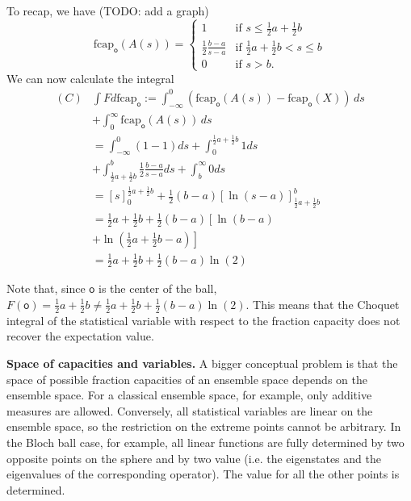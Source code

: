\documentclass[10pt,twocolumn, nofootinbib]{revtex4-2}
\newcommand\frcap{\mathrm{fcap}}
\newcommand{\ens}[1][e] {\mathsf{#1}} %
\begin{document}
To recap, we have (TODO: add a graph)
\begin{equation}
	\frcap_{\ens[o]}(A(s))=
	\begin{cases}
		1 & \text{if } s\leq \frac{1}{2} a + \frac{1}{2} b\\
		\frac{1}{2} \frac{b - a}{s-a} & \text{if } \frac{1}{2} a + \frac{1}{2} b < s \leq b\\
		0 & \text{if } s > b.
	\end{cases}
\end{equation}
We can now calculate the integral
\begin{equation}
	\begin{aligned}
		(C)&\int F d\frcap_{\ens[o]} := 
		\int_{-\infty}^0
		(\frcap_{\ens[o]} (A(s))-\frcap_{\ens[o]}(X))\, ds \\
		&+
		\int^\infty_0
		\frcap_{\ens[o]} (A(s))\, ds \\
		&= \int_{-\infty}^0 (1 - 1)ds + \int_{0}^{\frac{1}{2} a + \frac{1}{2} b}  1 ds \\
		&+ \int_{\frac{1}{2} a + \frac{1}{2} b}^{b}  \frac{1}{2} \frac{b - a}{s-a} ds + \int_{b}^{\infty} 0 ds \\
		&=\left[s\right]_{0}^{\frac{1}{2} a + \frac{1}{2} b}
		+ \frac{1}{2}\left(b - a\right)\left[\ln (s - a)\right]_{\frac{1}{2} a + \frac{1}{2} b}^{b} \\
		&= \frac{1}{2} a + \frac{1}{2} b + \frac{1}{2}\left(b - a\right)\left[\ln (b - a)\right. \\
		&+\left. \ln \left(\frac{1}{2} a + \frac{1}{2} b - a\right) \right] \\
		&= \frac{1}{2} a + \frac{1}{2} b + \frac{1}{2}\left(b - a\right)\ln (2)
	\end{aligned}
\end{equation}

Note that, since $\ens[o]$ is the center of the ball, $F(\ens[o]) = \frac{1}{2} a + \frac{1}{2} b \neq \frac{1}{2} a + \frac{1}{2} b + \frac{1}{2}\left(b - a\right)\ln (2)$. This means that the Choquet integral of the statistical variable with respect to the fraction capacity does not recover the expectation value.

\textbf{Space of capacities and variables.} A bigger conceptual problem is that the space of possible fraction capacities of an ensemble space depends on the ensemble space. For a classical ensemble space, for example, only additive measures are allowed. Conversely, all statistical variables are linear on the ensemble space, so the restriction on the extreme points cannot be arbitrary. In the Bloch ball case, for example, all linear functions are fully determined by two opposite points on the sphere and by two value (i.e. the eigenstates and the eigenvalues of the corresponding operator). The value for all the other points is determined.
\end{document}
